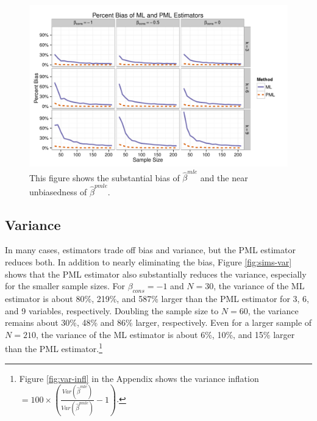 \documentclass[12pt]{article}
\begin{document}
\begin{figure}[h]
\begin{center}
\includegraphics[width = \textwidth]{figs/sims-percent-bias.pdf}
\caption{This figure shows the substantial bias of $\hat{\beta}^{mle}$ and the near unbiasedness of $\hat{\beta}^{pmle}$.}\label{fig:sims-coef-perc-bias}
\end{center}
\end{figure}

\subsection*{Variance}

In many cases, estimators trade off bias and variance, but the PML estimator reduces both.
In addition to nearly eliminating the bias, Figure \ref{fig:sims-var} shows that the PML estimator also substantially reduces the variance, especially for the smaller sample sizes.
For $\beta_{cons} = -1$ and $N = 30$, the variance of the ML estimator is about 80\%, 219\%, and 587\% larger than the PML estimator for 3, 6, and 9 variables, respectively.
Doubling the sample size to $N = 60$, the variance remains about 30\%, 48\% and 86\% larger, respectively. 
Even for a larger sample of $N = 210$, the variance of the ML estimator is about 6\%, 10\%, and 15\% larger than the PML estimator.\footnote{Figure \ref{fig:var-infl} in the Appendix shows the variance inflation $= 100 \times \left(\frac{Var(\hat{\beta} ^{mle})}{Var(\hat{\beta}^{pmle})} - 1\right)$.}
\end{document}
